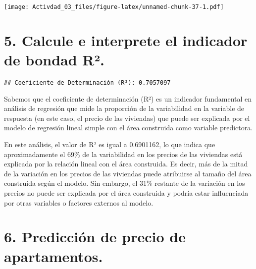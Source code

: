\documentclass[
]{article}
\newenvironment{Shaded}{\begin{snugshade}}{\end{snugshade}}
\newcommand{\FunctionTok}[1]{\textcolor[rgb]{0.13,0.29,0.53}{\textbf{#1}}}
\newcommand{\NormalTok}[1]{#1}
\newcommand{\OtherTok}[1]{\textcolor[rgb]{0.56,0.35,0.01}{#1}}
\newcommand{\SpecialCharTok}[1]{\textcolor[rgb]{0.81,0.36,0.00}{\textbf{#1}}}
\newcommand{\StringTok}[1]{\textcolor[rgb]{0.31,0.60,0.02}{#1}}
\begin{document}
\texttt{[image: Activdad\_03\_files/figure-latex/unnamed-chunk-37-1.pdf]}

\section{\texorpdfstring{\textbf{5. Calcule e interprete el indicador de
bondad
R².}}{5. Calcule e interprete el indicador de bondad R².}}\label{calcule-e-interprete-el-indicador-de-bondad-ruxb2.}

\begin{Shaded}
\end{Shaded}

\begin{verbatim}
## Coeficiente de Determinación (R²): 0.7057097
\end{verbatim}

Sabemos que el coeficiente de determinación (R²) es un indicador
fundamental en análisis de regresión que mide la proporción de la
variabilidad en la variable de respuesta (en este caso, el precio de las
viviendas) que puede ser explicada por el modelo de regresión lineal
simple con el área construida como variable predictora.

En este análisis, el valor de R² es igual a 0.6901162, lo que indica que
aproximadamente el 69\% de la variabilidad en los precios de las
viviendas está explicada por la relación lineal con el área construida.
Es decir, más de la mitad de la variación en los precios de las
viviendas puede atribuirse al tamaño del área construida según el
modelo. Sin embargo, el 31\% restante de la variación en los precios no
puede ser explicada por el área construida y podría estar influenciada
por otras variables o factores externos al modelo.

\section{\texorpdfstring{\textbf{6. Predicción de precio de
apartamentos.}}{6. Predicción de precio de apartamentos.}}\label{predicciuxf3n-de-precio-de-apartamentos.}
\end{document}
